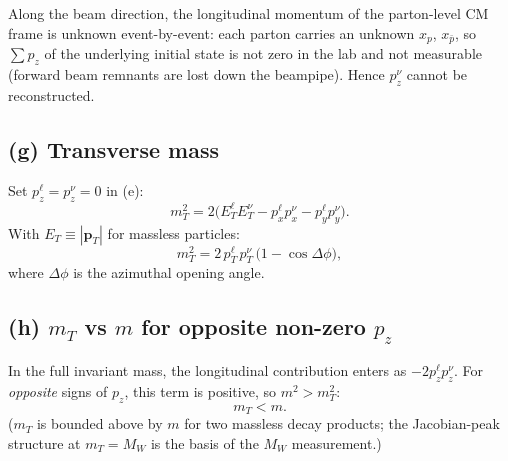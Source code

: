 \documentclass[11pt]{article}
\begin{document}
Along the beam direction, the longitudinal momentum of the parton-level CM frame is unknown event-by-event: each parton carries an unknown $x_{p}$, $x_{\bar p}$, so $\sum p_z$ of the underlying initial state is not zero in the lab and not measurable (forward beam remnants are lost down the beampipe). Hence $p_z^\nu$ cannot be reconstructed.

\subsection*{(g) Transverse mass}

Set $p^\ell_z=p^\nu_z=0$ in (e):
\[
m_T^2 = 2\bigl(E^\ell_T E^\nu_T - p^\ell_x p^\nu_x - p^\ell_y p^\nu_y\bigr).
\]
With $E_T \equiv |\bm p_T|$ for massless particles:
\[
\boxed{\;m_T^2 = 2\,p_T^\ell\,p_T^\nu\,\bigl(1-\cos\Delta\phi\bigr),\;}
\]
where $\Delta\phi$ is the azimuthal opening angle.

\subsection*{(h) $m_T$ vs $m$ for opposite non-zero $p_z$}

In the full invariant mass, the longitudinal contribution enters as $-2p_z^\ell p_z^\nu$. For \emph{opposite} signs of $p_z$, this term is positive, so $m^2 > m_T^2$:
\[
\boxed{\;m_T < m.\;}
\]
($m_T$ is bounded above by $m$ for two massless decay products; the Jacobian-peak structure at $m_T = M_W$ is the basis of the $M_W$ measurement.)
\end{document}
